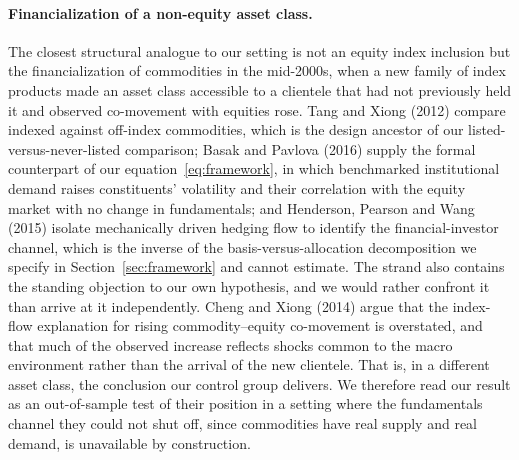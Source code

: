 \documentclass[12pt,a4paper]{article}
\begin{document}
\paragraph{Financialization of a non-equity asset class.} The closest structural analogue to our setting is not an equity index inclusion but the financialization of commodities in the mid-2000s, when a new family of index products made an asset class accessible to a clientele that had not previously held it and observed co-movement with equities rose. Tang and Xiong (2012) compare indexed against off-index commodities, which is the design ancestor of our listed-versus-never-listed comparison; Basak and Pavlova (2016) supply the formal counterpart of our equation~\eqref{eq:framework}, in which benchmarked institutional demand raises constituents' volatility and their correlation with the equity market with no change in fundamentals; and Henderson, Pearson and Wang (2015) isolate mechanically driven hedging flow to identify the financial-investor channel, which is the inverse of the basis-versus-allocation decomposition we specify in Section~\ref{sec:framework} and cannot estimate. The strand also contains the standing objection to our own hypothesis, and we would rather confront it than arrive at it independently. Cheng and Xiong (2014) argue that the index-flow explanation for rising commodity--equity co-movement is overstated, and that much of the observed increase reflects shocks common to the macro environment rather than the arrival of the new clientele. That is, in a different asset class, the conclusion our control group delivers. We therefore read our result as an out-of-sample test of their position in a setting where the fundamentals channel they could not shut off, since commodities have real supply and real demand, is unavailable by construction.
\end{document}
